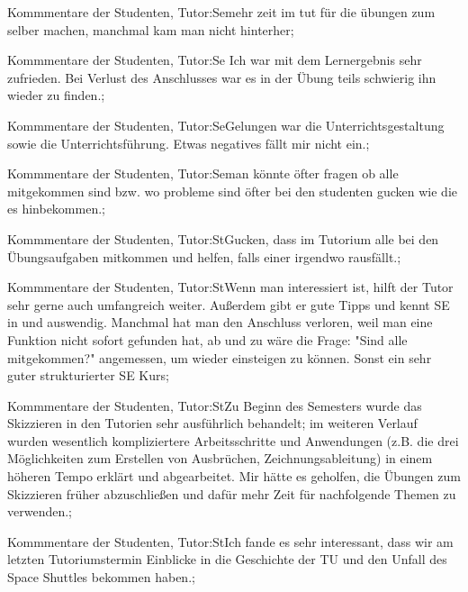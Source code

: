 \documentclass[10pt]{beamer}
\begin{document}
\begin{frame}[fragile]{Kommmentare der Studenten, Tutor:Se}mehr zeit im tut für die übungen zum selber machen, manchmal kam man nicht hinterher;
 \end{frame}
\begin{frame}[fragile]{Kommmentare der Studenten, Tutor:Se} Ich war mit dem Lernergebnis sehr zufrieden.   Bei Verlust des Anschlusses war es in der Übung teils schwierig ihn wieder zu finden.;
 \end{frame}
\begin{frame}[fragile]{Kommmentare der Studenten, Tutor:Se}Gelungen war die Unterrichtsgestaltung sowie die Unterrichtsführung. Etwas negatives fällt mir nicht ein.;
 \end{frame}
\begin{frame}[fragile]{Kommmentare der Studenten, Tutor:Se}man könnte öfter fragen ob alle mitgekommen sind bzw. wo probleme sind    öfter bei den studenten gucken wie die es hinbekommen.;
 \end{frame}
\begin{frame}[fragile]{Kommmentare der Studenten, Tutor:St}Gucken, dass im Tutorium alle bei den Übungsaufgaben mitkommen und helfen, falls einer irgendwo rausfällt.;
 \end{frame}
\begin{frame}[fragile]{Kommmentare der Studenten, Tutor:St}Wenn man interessiert ist, hilft der Tutor sehr gerne auch umfangreich weiter. Außerdem gibt er gute Tipps und kennt SE in und auswendig. Manchmal hat man den Anschluss verloren, weil man eine Funktion nicht sofort gefunden hat, ab und zu wäre die Frage: "Sind alle mitgekommen?" angemessen, um wieder einsteigen zu können.
 Sonst ein sehr guter strukturierter SE Kurs;
 \end{frame}
\begin{frame}[fragile]{Kommmentare der Studenten, Tutor:St}Zu Beginn des Semesters wurde das Skizzieren in den Tutorien sehr ausführlich behandelt; im weiteren Verlauf wurden wesentlich kompliziertere Arbeitsschritte und Anwendungen (z.B. die drei Möglichkeiten zum Erstellen von Ausbrüchen, Zeichnungsableitung) in einem höheren Tempo erklärt und abgearbeitet. Mir hätte es geholfen, die Übungen zum Skizzieren früher abzuschließen und dafür mehr Zeit für nachfolgende Themen zu verwenden.;
 \end{frame}
\begin{frame}[fragile]{Kommmentare der Studenten, Tutor:St}Ich fande es sehr interessant, dass wir am letzten Tutoriumstermin Einblicke in die Geschichte der TU und den Unfall des Space Shuttles bekommen haben.;
 \end{frame}
\end{document}
